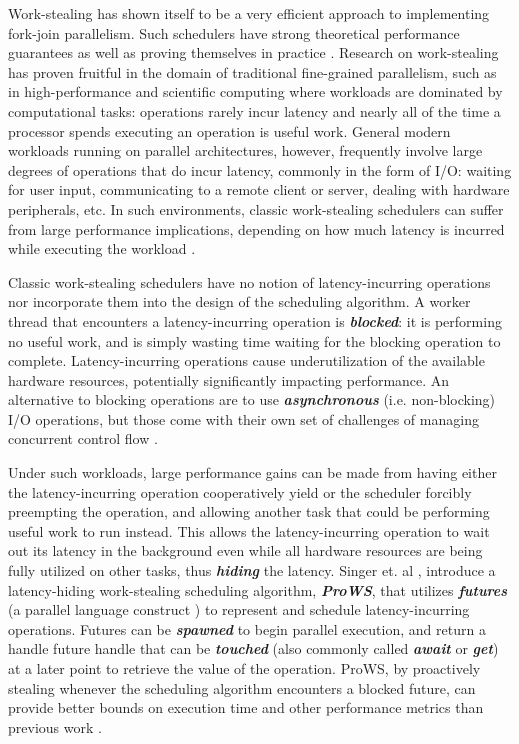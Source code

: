 \documentclass[bsc,frontabs,singlespacing,parskip,deptreport,normalheadings]{infthesis}
\begin{document}
Work-stealing has shown itself to be a very efficient approach to implementing
fork-join parallelism. Such schedulers have strong theoretical performance
guarantees \cite{blumofe_scheduling_1999} as well as proving themselves in
practice \cite{arora_thread_1998}. Research on work-stealing has proven fruitful
in the domain of traditional fine-grained parallelism, such as in
high-performance and scientific computing where workloads are dominated by
computational tasks: operations rarely incur latency and nearly all of the time
a processor spends executing an operation is useful work. General modern
workloads running on parallel architectures, however, frequently involve large
degrees of operations that do incur latency, commonly in the form of I/O:
waiting for user input, communicating to a remote client or server, dealing with
hardware peripherals, etc. In such environments, classic work-stealing
schedulers can suffer from large performance implications, depending on how much
latency is incurred while executing the workload
\cite{muller_latency-hiding_2016, singer_scheduling_2019, zakian_concurrent_2016}.

Classic work-stealing schedulers have no notion of latency-incurring operations
nor incorporate them into the design of the scheduling algorithm. A worker
thread that encounters a latency-incurring operation is
\textbf{\textit{blocked}}: it is performing no useful work, and is simply
wasting time waiting for the blocking operation to complete. Latency-incurring
operations cause underutilization of the available hardware resources,
potentially significantly impacting performance. An alternative to blocking
operations are to use \textbf{\textit{asynchronous}} (i.e. non-blocking) I/O
operations, but those come with their own set of challenges of managing
concurrent control flow \cite{niebler_structured_2020, smith_notes_nodate}.

Under such workloads, large performance gains can be made from having either the
latency-incurring operation cooperatively yield or the scheduler forcibly
preempting the operation, and allowing another task that could be performing
useful work to run instead. This allows the latency-incurring operation to wait
out its latency in the background even while all hardware resources are being
fully utilized on other tasks, thus \textbf{\textit{hiding}} the latency. Singer
et. al \cite{singer_proactive_2019}, introduce a latency-hiding work-stealing
scheduling algorithm, \textit{\textbf{ProWS}}, that utilizes
\textbf{\textit{futures}} (a parallel language construct
\cite{halstead_implementation_1984, halstead_multilisp_1985}) to represent and
schedule latency-incurring operations. Futures can be \textbf{\textit{spawned}}
to begin parallel execution, and return a handle future handle that can be
\textbf{\textit{touched}} (also commonly called \textbf{\textit{await}} or
\textbf{\textit{get}}) at a later point to retrieve the value of the operation.
ProWS, by proactively stealing whenever the scheduling algorithm encounters a
blocked future, can provide better bounds on execution time and other
performance metrics than previous work \cite{muller_latency-hiding_2016,
spoonhower_beyond_2009}.
\end{document}

